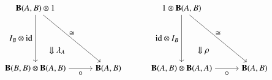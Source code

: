 \documentclass[12pt]{ociamthesis}
\newcommand{\id}{\mathrm{id}}
\begin{document}
\begin{equation*}
\begin{aligned}
\begin{tikzpicture}[yscale=2.5, xscale=3]
\node (A) at (0,1){${\cat B}(A,B) \otimes 1$};
\node (B) at (1,0) {${\cat B}(A,B)$};
\node (D) at (0,0) {${\cat B}(B,B) \otimes {\cat B}(A,B)$};
\node (C) at (.3,.3){$\Downarrow \lambda_{A}$};
\draw[->] (A) to node[above]{$\iso$} (B);
\draw[->] (D) to node[below]{$\comp$} (B);
\draw[->] (A) to node[left]{$  I_B \otimes \id$} (D);
\end{tikzpicture}
\hspace{1cm}
\begin{tikzpicture}[yscale=2.5, xscale=3]
\node (A) at (0,1){$1 \otimes {\cat B}(A,B)$};
\node (B) at (1,0) {${\cat B}(A,B)$};
\node (D) at (0,0) {${\cat B}(A,B) \otimes {\cat B}(A,A)$};
\node (C) at (.3,.3){$\Downarrow\rho$};
\draw[->] (A) to node[above]{$\iso$} (B);
\draw[->] (D) to node[below]{$\comp$} (B);
\draw[->] (A) to node[left]{$\id \otimes I_B$} (D);
\end{tikzpicture}
\end{aligned}
\end{equation*}
\end{document}
